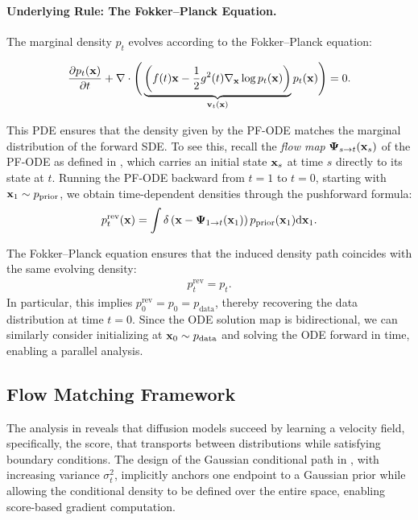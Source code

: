 \paragraph{Underlying Rule: The Fokker–Planck Equation.}
The marginal density $p_t$ evolves according to the Fokker–Planck equation:
\begin{mdframed}
\begin{align*}
    \frac{\partial p_t({\mathbf{x}})}{\partial t} + \nabla \cdot \Bigg( \underbrace{\left(f(t){\mathbf{x}} - \frac{1}{2}g^2(t) \nabla_{\mathbf{x}} \log p_t({\mathbf{x}})\right)}_{{\mathbf{v}}_t({\mathbf{x}})}  p_t({\mathbf{x}}) \Bigg) = 0.
\end{align*}
\end{mdframed}
This PDE ensures that the density given by the PF-ODE matches the marginal distribution of the forward SDE.  
To see this, recall the \emph{flow map} ${\bm{\Psi}}_{s \to t}({\mathbf{x}}_s)$ of the PF-ODE as defined in , which carries an initial state ${\mathbf{x}}_s$ at time $s$ directly to its state at $t$.  
Running the PF-ODE backward from $t=1$ to $t=0$, starting with ${\mathbf{x}}_1 \sim p_{\mathrm{prior}}$, we obtain time-dependent densities through the pushforward formula:
\begin{align}\label{eq:pushforward-ode}
    p_t^{\mathrm{rev}}({\mathbf{x}})
    = \int \delta \left({\mathbf{x}} - {\bm{\Psi}}_{1 \to t}({\mathbf{x}}_1)\right) 
      p_{\mathrm{prior}}({\mathbf{x}}_1) \mathrm{d}{\mathbf{x}}_1.
\end{align}

The Fokker–Planck equation ensures that the induced density path coincides with the same evolving density:
\begin{align}\label{eq:p_t-fwd-rev}
p_t^{\mathrm{rev}} = p_t.
\end{align}
In particular, this implies $p_0^{\mathrm{rev}} = p_0 = p_{\text{data}}$, thereby recovering the data distribution at time $t=0$. Since the ODE solution map is bidirectional, we can similarly consider initializing at 
${\mathbf{x}}_0 \sim p_{\text{data}}$ and solving the ODE forward in time, enabling a parallel analysis.


\subsection{Flow Matching Framework}\label{subsec:fm-framework}

The analysis in  reveals that diffusion models succeed by learning a velocity field, specifically, the score, that transports between distributions while satisfying boundary conditions. The design of the Gaussian conditional path in , with increasing variance $\sigma_t^2$, implicitly anchors one endpoint to a Gaussian prior while allowing the conditional density to be defined over the entire space, enabling score-based gradient computation.

